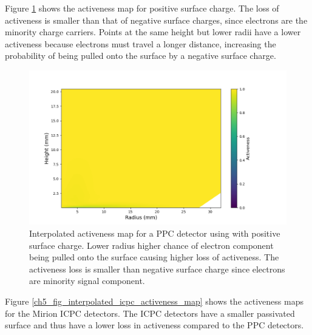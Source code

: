 Figure \ref{ch5_fig_interpolated_activeness_map_pos} shows the activeness map for positive surface charge. The loss of activeness is smaller than that of negative surface charges, since electrons are the minority charge carriers. Points at the same height but lower radii have a lower activeness because electrons must travel a longer distance, increasing the probability of being pulled onto the surface by a negative surface charge.

\begin{figure}%
\centering
\includegraphics[trim={1.5cm 0cm 3.3cm 1cm},clip,width=0.95\linewidth]{ch5/figs/activeness_map_cubic_sc=0.3_ponama_1_5000.png}
\caption{Interpolated activeness map for a PPC detector using \ehd with positive surface charge. Lower radius higher chance of electron component being pulled onto the surface causing higher loss of activeness. The activeness loss is smaller than negative surface charge since electrons are minority signal component.}
\label{ch5_fig_interpolated_activeness_map_pos}
\end{figure}

Figure \ref{ch5_fig_interpolated_icpc_activeness_map} shows the activeness maps for the Mirion ICPC detectors. The ICPC detectors have a smaller passivated surface and thus have a lower loss in activeness compared to the PPC detectors. 

